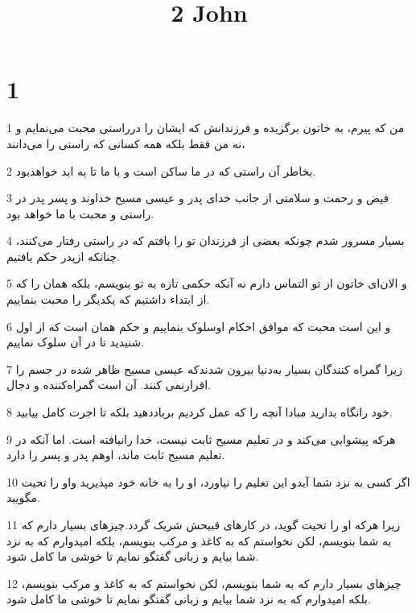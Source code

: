 

\title{2 John}


\chapter{1}

\par 1 من که پیرم، به خاتون برگزیده و فرزندانش که ایشان را درراستی محبت می‌نمایم و نه من فقط بلکه همه کسانی که راستی را می‌دانند،
\par 2 بخاطر آن راستی که در ما ساکن است و با ما تا به ابد خواهدبود.
\par 3 فیض و رحمت و سلامتی از جانب خدای پدر و عیسی مسیح خداوند و پسر پدر در راستی و محبت با ما خواهد بود.
\par 4 بسیار مسرور شدم چونکه بعضی از فرزندان تو را یافتم که در راستی رفتار می‌کنند، چنانکه ازپدر حکم یافتیم.
\par 5 و الان‌ای خاتون از تو التماس دارم نه آنکه حکمی تازه به تو بنویسم، بلکه همان را که از ابتداء داشتیم که یکدیگر را محبت بنماییم.
\par 6 و این است محبت که موافق احکام اوسلوک بنماییم و حکم همان است که از اول شنیدید تا در آن سلوک نماییم.
\par 7 زیرا گمراه کنندگان بسیار به‌دنیا بیرون شدندکه عیسی مسیح ظاهر شده در جسم را اقرارنمی کنند. آن است گمراه‌کننده و دجال.
\par 8 خود رانگاه بدارید مبادا آنچه را که عمل کردیم برباددهید بلکه تا اجرت کامل بیابید.
\par 9 هرکه پیشوایی می‌کند و در تعلیم مسیح ثابت نیست، خدا رانیافته است. اما آنکه در تعلیم مسیح ثابت ماند، اوهم پدر و پسر را دارد.
\par 10 اگر کسی به نزد شما آیدو این تعلیم را نیاورد، او را به خانه خود مپذیرید واو را تحیت مگویید.
\par 11 زیرا هرکه او را تحیت گوید، در کارهای قبیحش شریک گردد.چیزهای بسیار دارم که به شما بنویسم، لکن نخواستم که به کاغذ و مرکب بنویسم، بلکه امیدوارم که به نزد شما بیایم و زبانی گفتگو نمایم تا خوشی ما کامل شود.
\par 12 چیزهای بسیار دارم که به شما بنویسم، لکن نخواستم که به کاغذ و مرکب بنویسم، بلکه امیدوارم که به نزد شما بیایم و زبانی گفتگو نمایم تا خوشی ما کامل شود.



